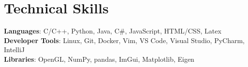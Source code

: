 \documentclass[letterpaper,11pt]{article}
\begin{document}
\section{Technical Skills}
 \begin{itemize}[leftmargin=0.15in, label={}]
    \small{\item{
     \textbf{Languages}{: C/C++, Python, Java, C\#, JavaScript, HTML/CSS, Latex} \\
     \textbf{Developer Tools}{: Linux, Git, Docker, Vim, VS Code, Visual Studio, PyCharm, IntelliJ} \\
     \textbf{Libraries}{: OpenGL, NumPy, pandas, ImGui, Matplotlib, Eigen}
    }}
 \end{itemize}


\end{document}
